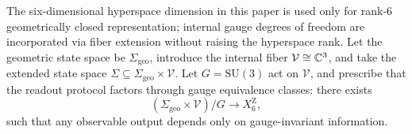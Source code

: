 The six-dimensional hyperspace dimension in this paper is used only for rank-$6$ geometrically closed representation; internal gauge degrees of freedom are incorporated via fiber extension without raising the hyperspace rank. Let the geometric state space be $\Sigma_{\mathrm{geo}}$, introduce the internal fiber $\mathcal{V}\cong\mathbb{C}^3$, and take the extended state space $\Sigma\subseteq\Sigma_{\mathrm{geo}}\times\mathcal{V}$. Let $G=\mathrm{SU}(3)$ act on $\mathcal{V}$, and prescribe that the readout protocol factors through gauge equivalence classes: there exists
$$
(\Sigma_{\mathrm{geo}}\times\mathcal{V})/G\to X_6^{\mathrm Z},
$$
such that any observable output depends only on gauge-invariant information.
